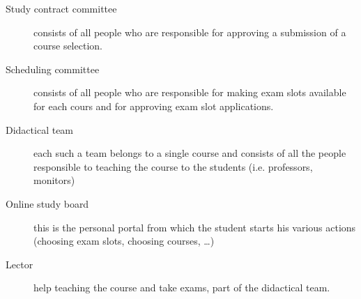 \begin{description}
\item[Study contract committee] consists of all people who are responsible for
approving a submission of a course selection.
\item[Scheduling committee] consists of all people who are responsible for making
exam slots available for each cours and for approving exam slot applications.
\item[Didactical team] each such a team belongs to a single course and consists of all 
the people responsible to teaching the course to the students (i.e. professors, monitors) 
\item[Online study board] this is the personal portal from which the student starts his
various actions (choosing exam slots, choosing courses, \ldots)
\item[Lector] help teaching the course and take exams, part of the didactical team.
\end{description}
